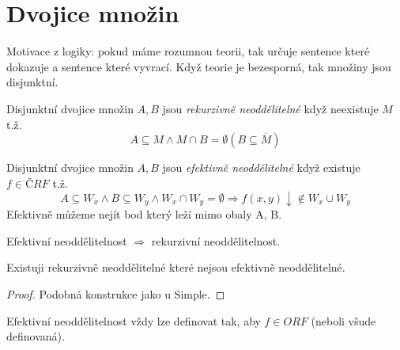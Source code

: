\section{\texorpdfstring{Dvojice množin}{Dvojice množin}}
\vspace{5mm}
\large

\begin{note}
	Motivace z logiky: pokud máme rozumnou teorii, tak určuje sentence které dokazuje a sentence které vyvrací.
	Když teorie je bezesporná, tak množiny jsou disjunktní.
\end{note}

\begin{definition}
	Disjunktní dvojice množin $A, B$ jsou \emph{rekurzivně neoddělitelné} když neexistuje $M$ t.ž.
	\[ A \subseteq M \land M \cap B = \emptyset (B \subseteq \overline{M}) \]
\end{definition}

\begin{definition}
	Disjunktní dvojice množin $A, B$ jsou \emph{efektivně neoddělitelné} když existuje $f \in ČRF$ t.ž.
	\[ A \subseteq W_x \land B \subseteq W_y \land W_x \cap W_y = \emptyset \Rightarrow f(x, y) \downarrow \notin W_x \cup W_y \]
	Efektivně můžeme nejít bod který leží mimo obaly A, B.
\end{definition}

\begin{note}
	Efektivní neoddělitelnost $\Rightarrow$ rekurzivní neoddělitelnost.
\end{note}

\begin{theorem}
	Existuji rekurzivně neoddělitelné které nejsou efektivně neoddělitelné.
\end{theorem}
\begin{proof}
	Podobná konstrukce jako u Simple.
\end{proof}

\begin{note}
	Efektivní neoddělitelnost vždy lze definovat tak, aby $f \in ORF$ (neboli všude definovaná).
\end{note}

